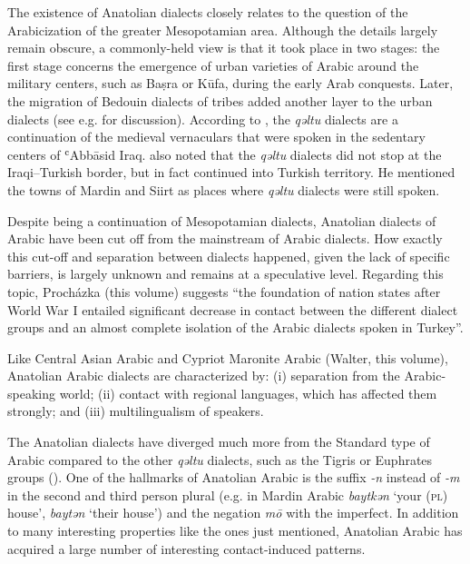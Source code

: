 \documentclass[output=paper]{langsci/langscibook}
\begin{document}
The existence of Anatolian dialects closely relates to the question of the Arabicization of the greater Mesopotamian area. Although the details largely remain obscure, a commonly-held view is that it took place in two stages: the first stage concerns the emergence of urban varieties of Arabic around the military centers, such as Ba\d{s}ra or K\={u}fa, during the early Arab conquests. Later, the migration of Bedouin dialects of tribes added another layer to the urban dialects (see e.g. \citealt{Blanc1964,Versteegh1997,Jastrow2006} for discussion). According to \cite{Blanc1964}, the \textit{qəltu} dialects are a continuation of the medieval vernaculars that were spoken in the sedentary centers of ʿAbb\={a}sid Iraq. \cite{Blanc1964} also noted that the \textit{qəltu} dialects did not stop at the Iraqi--Turkish border, but in fact continued into Turkish territory. He mentioned the towns of Mardin and Siirt as places where \textit{qəltu} dialects were still spoken.

Despite being a continuation of Mesopotamian dialects, Anatolian dialects of Arabic have been cut off from the mainstream of Arabic dialects. How exactly this cut-off and separation between dialects happened, given the lack of specific barriers, is largely unknown and remains at a speculative level. Regarding this topic, Proch\'{a}zka (this volume) suggests ``the foundation of nation states after World War I entailed significant decrease in contact between the different dialect groups and an almost complete isolation of the Arabic dialects spoken in Turkey''.

Like Central Asian Arabic and Cypriot Maronite Arabic (Walter, this volume), Anatolian Arabic dialects are characterized by: (i) separation from the Arabic-speaking world; (ii) contact with regional languages, which has affected them strongly; and (iii) multilingualism of speakers. %

The Anatolian dialects have diverged much more from the Standard type of Arabic compared to the other \textit{qəltu} dialects, such as the Tigris or Euphrates groups (\citealt{Jastrow2011iraq}). One of the hallmarks of Anatolian Arabic is the suffix \textit{-n} instead of \textit{-m} in the second and third person plural (e.g. in Mardin Arabic \textit{baytkən} `your (\textsc{pl}) house', \textit{baytən} `their house') and the negation \textit{m\={o}} with the imperfect. In addition to many interesting properties like the ones just mentioned, Anatolian Arabic has acquired a large number of interesting contact-induced patterns.
\end{document}
